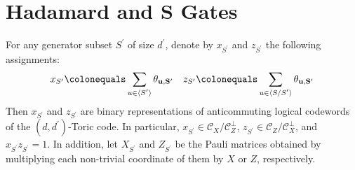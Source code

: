 \section{Hadamard and S Gates}


\begin{claim}
For any generator subset $S^{\prime}$ of size $d^{\prime}$, denote by $x_{S^{\prime}}$ and $z_{S^{\prime}}$ the following assignments:
\begin{equation*}
  \begin{split}
    x_{S^{\prime}}  \colonequals \sum_{u \in \expval*{S^{\prime}} }\rotfv{u}{S^{\prime}} \ \ \ z_{S^{\prime}} \colonequals \sum_{u \in \expval*{S/S^{\prime}} }\rotfv{u}{S^{\prime}} 
  \end{split}
\end{equation*}
Then $x_{S^{\prime}}$ and $z_{S^{\prime}}$ are binary representations of anticommuting logical codewords of the $(d,d^{\prime})$-Toric code. In particular, $x_{S^{\prime}} \in \mathcal{C}_{X}/\mathcal{C}_{Z}^{\perp}$, $z_{S^{\prime}} \in \mathcal{C}_{Z}/\mathcal{C}_{X}^{\perp}$, and $x_{S^{\prime}} z_{S^{\prime}} = 1$. In addition, let $X_{S^{\prime}}$ and $Z_{S^{\prime}}$ be the Pauli matrices obtained by multiplying each non-trivial coordinate of them by $X$ or $Z$, respectively.
\end{claim}
